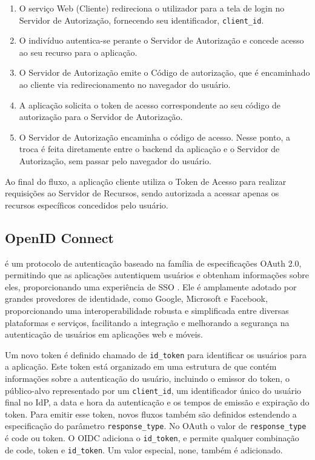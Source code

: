 \begin{enumerate}
    
    \item O serviço Web (Cliente) redireciona o utilizador para a tela de login no Servidor de Autorização, fornecendo seu identificador, \texttt{client\_id}.
    
    \item O indivíduo autentica-se perante o Servidor de Autorização e concede acesso ao seu recurso para o aplicação.
    
    \item O Servidor de Autorização emite o Código de autorização, que é encaminhado ao cliente via redirecionamento no navegador do usuário.
    
    \item A aplicação solicita o token de acesso correspondente ao seu código de autorização para o Servidor de Autorização. 
    
    \item O Servidor de Autorização encaminha o código de acesso. Nesse ponto, a troca é feita diretamente entre o backend da aplicação e o Servidor de Autorização, sem passar pelo navegador do usuário.

\end{enumerate}

Ao final do fluxo, a aplicação cliente utiliza o Token de Acesso para realizar requisições ao Servidor de Recursos, sendo autorizada a acessar apenas os recursos específicos concedidos pelo usuário. 

\subsection{OpenID Connect}\label{subsec:OIDC}

 é um protocolo de autenticação baseado na família de especificações OAuth 2.0, permitindo que as aplicações autentiquem usuários e obtenham informações sobre eles, proporcionando uma experiência de \acs{SSO} \cite{openid}. Ele é amplamente adotado por grandes provedores de identidade, como Google, Microsoft e Facebook, proporcionando uma interoperabilidade robusta e simplificada entre diversas plataformas e serviços, facilitando a integração e melhorando a segurança na autenticação de usuários em aplicações web e móveis.

Um novo token é definido chamado de \texttt{id\_token} para identificar os usuários para a aplicação. Este token está organizado em uma estrutura de  que contém informações sobre a autenticação do usuário, incluindo o emissor do token, o público-alvo representado por um \texttt{client\_id}, um identificador único do usuário final no IdP, a data e hora da autenticação e os tempos de emissão e expiração do token. Para emitir esse token, novos fluxos também são definidos estendendo a especificação do parâmetro \texttt{response\_type}. No OAuth o valor de \texttt{response\_type} é code ou token. O \acs{OIDC} adiciona o \texttt{id\_token}, e permite qualquer combinação de code, token e \texttt{id\_token}. Um valor especial, none, também é adicionado. 

